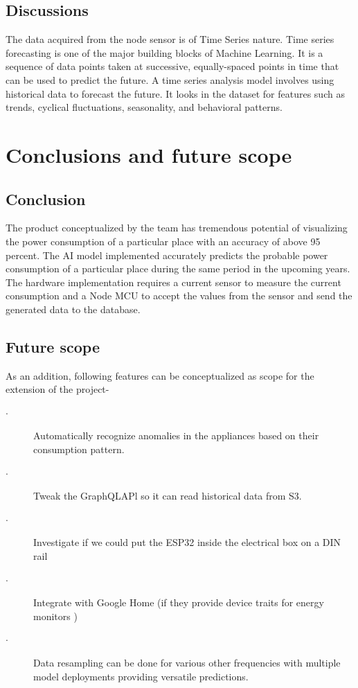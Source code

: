 \documentclass[12 pt]{report}
\begin{document}
\section{Discussions}
\par
The data acquired from the node sensor is of Time Series nature. Time series forecasting is one of the major building blocks of Machine Learning. It is a sequence of data points taken at successive, equally-spaced points in time that can be used to predict the future. A time series analysis model involves using historical data to forecast the future. It looks in the dataset for features such as trends, cyclical fluctuations, seasonality, and behavioral patterns.

\newpage

\chapter{Conclusions and future scope}
\section{Conclusion}

The product conceptualized by the team has tremendous potential of visualizing the power consumption  of a particular place with an accuracy of above 95 percent. The AI model implemented accurately predicts the probable power consumption of a particular place during the same period in the upcoming years. The hardware implementation requires a current sensor to measure the current consumption and a Node MCU to accept the values from the sensor and send the generated data to the database.






\section{Future scope}
 As an addition, following features can be conceptualized as scope for the extension of the project- 
 \begin{description}
  \item[$\cdot$ ] Automatically recognize anomalies in the appliances based on their consumption pattern. 
 \item[$\cdot$ ] Tweak the GraphQLAPl so it can read historical data from S3. \item[$\cdot$ ]Investigate if we could put the ESP32 inside the electrical box on a DIN rail
 \item[$\cdot$ ]Integrate with Google Home (if they provide device traits for energy monitors )
 \item[$\cdot$ ] Data resampling can be done for various other frequencies with multiple model deployments providing versatile predictions.
\end{description}
\end{document}

